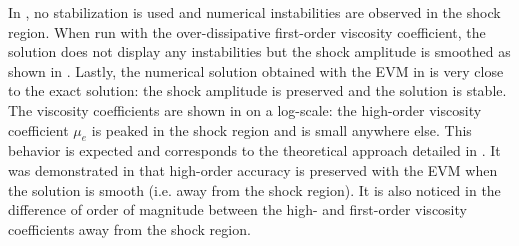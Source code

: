 %
In , no stabilization  is used and numerical instabilities are observed in the shock region. When run with the over-dissipative first-order viscosity coefficient, the solution does not display any instabilities but the shock amplitude is smoothed as shown in . Lastly, the numerical solution obtained with the EVM in  is very close to the exact solution: the shock amplitude is preserved and the solution is stable. The viscosity coefficients are shown in  on a log-scale: the high-order viscosity coefficient $\mu_e$ is peaked in the shock region and is small anywhere else. This behavior is expected and corresponds to the theoretical approach detailed in . It was demonstrated in \cite{valentin} that high-order accuracy is preserved with the EVM when the solution is smooth (i.e. away from the shock region). It is also noticed in  the difference of order of magnitude between the high- and first-order viscosity coefficients away from the shock region.
